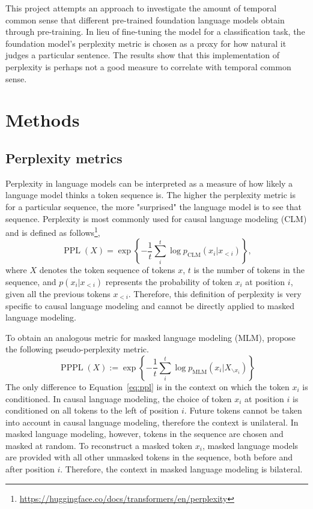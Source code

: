 \documentclass[11pt]{article}
\DeclareMathOperator{\PPL}{PPL}
\DeclareMathOperator{\PPPL}{PPPL}
\begin{document}
This project attempts an approach to investigate the amount of temporal common sense that different pre-trained foundation language models obtain through pre-training. In lieu of fine-tuning the model for a classification task, the foundation model's perplexity metric is chosen as a proxy for how natural it judges a particular sentence. The results show that this implementation of perplexity is perhaps not a good measure to correlate with temporal common sense.



\section{Methods} %
\label{sec:Methods}

\subsection{Perplexity metrics}
\label{sec:ppl}
Perplexity in language models can be interpreted as a measure of how likely a language model thinks a token sequence is. The higher the perplexity metric is for a particular sequence, the more "surprised" the language model is to see that sequence. Perplexity is most commonly used for causal language modeling (CLM) and is defined as follows\footnote{\url{https://huggingface.co/docs/transformers/en/perplexity}},
\begin{equation}
  \PPL(X) = \exp \left\{ - \frac{1}{t} \sum^t_i \log p_\text{CLM} (x_i | x_{<i}) \right\},
  \label{eq:ppl}
\end{equation}
where $X$ denotes the token sequence of tokens $x$, $t$ is the number of tokens in the sequence, and $p(x_i | x_{<i})$ represents the probability of token $x_i$ at position $i$, given all the previous tokens $x_{<i}$. Therefore, this definition of perplexity is very specific to causal language modeling and cannot be directly applied to masked language modeling.

To obtain an analogous metric for masked language modeling (MLM), \citet{pppl} propose the following pseudo-perplexity metric.
\begin{equation}
  \PPPL(X) := \exp \left\{ - \frac{1}{t} \sum^t_i \log p_\text{MLM} (x_i | X_{\backslash x_i}) \right\}
  \label{eq:pppl}
\end{equation}
The only difference to Equation~\ref{eq:ppl} is in the context on which the token $x_i$ is conditioned. In causal language modeling, the choice of token $x_i$ at position $i$ is conditioned on all tokens to the left of position $i$. Future tokens cannot be taken into account in causal language modeling, therefore the context is unilateral. In masked language modeling, however, tokens in the sequence are chosen and masked at random. To reconstruct a masked token $x_i$, masked language models are provided with all other unmasked tokens in the sequence, both before and after position $i$. Therefore, the context in masked language modeling is bilateral.
\end{document}
